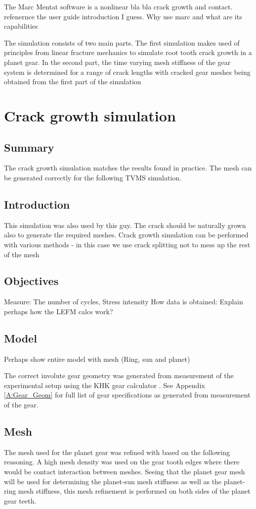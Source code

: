 The Marc Mentat software  is a nonlinear bla bla crack growth and contact. refenernce the user guide introduction I guess. Why use marc and what are its capabilities
	
The simulation consists of two main parts. The first simulation makes used of principles from linear fracture mechanics to simulate root tooth crack growth in a planet gear. In the second part, the time varying mesh stiffness of the gear system is determined for a range of crack lengths with cracked gear meshes being obtained from the first part of the simulation


\section{Crack growth simulation}

\subsection{Summary}
The crack growth simulation matches the results found in practice. The mesh can be generated correctly for the following TVMS simulation.

\subsection{Introduction}
This simulation was also used by this guy. 
The crack should be naturally grown also to generate the required meshes.
Crack growth simulation can be performed with various methods - in this case we use crack splitting not to mess up the rest of the mesh

\subsection{Objectives}
Measure: The number of cycles, Stress intensity
How data is obtained: Explain perhaps how the LEFM calcs work?

\subsection{Model}
Perhaps show entire model with mesh (Ring, sun and planet)

The correct involute gear geometry was generated from measurement of the experimental setup using the KHK gear calculator \cite{KHK2015}. See Appendix \ref{A:Gear_Geom} for full list of gear specifications as generated from measurement of the gear. 


\subsection{Mesh}
The mesh used for the planet gear was refined with based on the following reasoning. A high mesh density was used on the gear tooth edges where there would be contact interaction between meshes. Seeing that the planet gear mesh will be used for determining the planet-sun mesh stiffness as well as the planet-ring mesh stiffness, this mesh refinement is performed on both sides of the planet gear teeth. 

